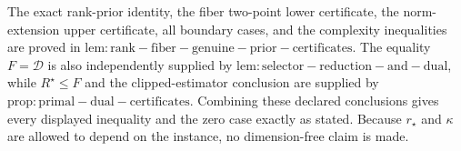 The exact rank-prior identity, the fiber two-point lower certificate, the norm-extension upper certificate, all boundary cases, and the complexity inequalities are proved in \(\mathrm{lem:rank-fiber-genuine-prior-certificates}\). The equality \(F=\mathcal D\) is also independently supplied by \(\mathrm{lem:selector-reduction-and-dual}\), while \(R^{\star}\le F\) and the clipped-estimator conclusion are supplied by \(\mathrm{prop:primal-dual-certificates}\). Combining these declared conclusions gives every displayed inequality and the zero case exactly as stated. Because \(r_{\star}\) and \(\kappa\) are allowed to depend on the instance, no dimension-free claim is made.